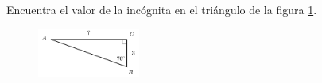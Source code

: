 Encuentra el valor de la incógnita en el triángulo de la figura \ref{fig:lados_functrig_22}.
\begin{figure}[H]
    \begin{center}
        \includegraphics[width=0.3\textwidth]{../images/lados_functrig_22.png}
    \end{center}
    \caption{}
    \label{fig:lados_functrig_22}
\end{figure}